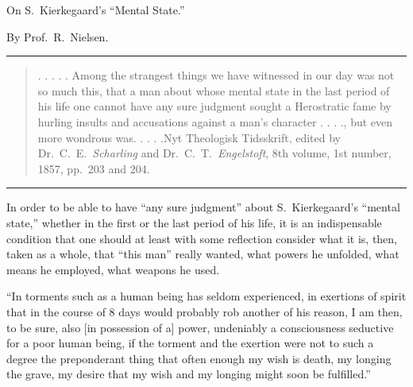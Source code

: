 \documentclass[12pt,a4paper]{article}
\newcommand{\opage}[1]{\marginnote{\footnotesize\textit{[#1]}}}
\begin{document}
\opage{1}
\begin{center}
  {\large On S.\ Kierkegaard's ``Mental State.''}

  \medskip
  By Prof.\ R.\ Nielsen.
\end{center}

\bigskip
\begin{center}\rule{0.25\linewidth}{0.4pt}\end{center}
\bigskip

\begin{quote}\small
. . . . . Among the strangest things we have witnessed in our
day was not so much this, that a man about whose mental
state in the last period of his life one cannot have any
sure judgment sought a Herostratic fame by hurling insults
and accusations against a man's character . . . ., but
even more wondrous was. . . . .\quad Nyt Theologisk Tidsskrift, edited
by Dr.\ C.\ E.\ \emph{Scharling} and Dr.\ C.\ T.\ \emph{Engelstoft}, 8th volume,
1st number, 1857, pp.\ 203 and 204.
\end{quote}

\bigskip
\begin{center}\rule{0.25\linewidth}{0.4pt}\end{center}
\bigskip

In order to be able to have ``any sure judgment'' about S.\ Kierkegaard's
``mental state,'' whether in the first or the
last period of his life, it is an indispensable condition
that one should at least with some reflection consider
what it is, then, taken as a whole, that ``this man''
really wanted, what powers he unfolded, what means
he employed, what weapons he used.

``In torments such as a human being has seldom experienced,
in exertions of spirit that in the course of 8 days would probably
rob another of his reason, I am then, to be sure, also [in possession of a]
power, undeniably a consciousness seductive for a poor human being,
if the torment and the exertion were not to such a
degree the preponderant thing that often enough my wish is
\opage{2}
death, my longing the grave, my desire that my wish
and my longing might soon be fulfilled.''
\end{document}
